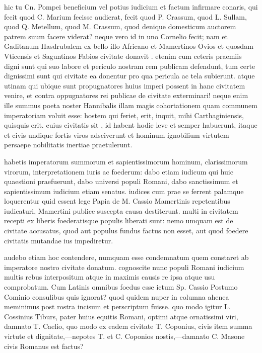  hic tu Cn. Pompei beneficium vel potius iudicium et factum infirmare conaris, qui fecit quod C. Marium fecisse audierat, fecit quod P. Crassum, quod L. Sullam, quod Q. Metellum, quod M. Crassum, quod denique domesticum auctorem patrem suum facere viderat? neque vero id in uno Cornelio fecit; nam et Gaditanum Hasdrubalem ex bello illo Africano et Mamertinos Ovios et quosdam Vticensis et Saguntinos Fabios civitate donavit . etenim cum ceteris praemiis digni sunt qui suo labore et periculo nostram rem publicam defendunt, tum certe dignissimi sunt qui civitate ea donentur pro qua pericula ac tela subierunt. atque utinam qui ubique sunt propugnatores huius imperi possent in hanc civitatem venire, et contra oppugnatores rei publicae de civitate exterminari! neque enim ille summus poeta noster Hannibalis illam magis cohortationem quam communem imperatoriam voluit esse: hostem qui feriet, erit, inquit, mihi Carthaginiensis, quisquis erit. cuius civitatis sit , id habent hodie leve et semper habuerunt, itaque et civis undique fortis viros adsciverunt et hominum ignobilium virtutem persaepe nobilitatis inertiae praetulerunt.

 habetis imperatorum summorum et sapientissimorum hominum, clarissimorum virorum, interpretationem iuris ac foederum: dabo etiam iudicum qui huic quaestioni praefuerunt, dabo universi populi Romani, dabo sanctissimum et sapientissimum iudicium etiam senatus. iudices cum prae se ferrent palamque loquerentur quid essent lege Papia de M. Cassio Mamertinis repetentibus iudicaturi, Mamertini publice suscepta causa destiterunt. multi in civitatem recepti ex liberis foederatisque populis liberati sunt: nemo umquam est de civitate accusatus, quod aut populus fundus factus non esset, aut quod foedere civitatis mutandae ius impediretur.

 audebo etiam hoc contendere, numquam esse condemnatum quem constaret ab imperatore nostro civitate donatum. cognoscite nunc populi Romani iudicium multis rebus interpositum atque in maximis causis re ipsa atque usu comprobatum. Cum Latinis omnibus foedus esse ictum Sp. Cassio Postumo Cominio consulibus quis ignorat? quod quidem nuper in columna ahenea meminimus post rostra incisum et perscriptum fuisse. quo modo igitur L. Cossinius Tiburs, pater huius equitis Romani, optimi atque ornatissimi viri, damnato T. Caelio, quo modo ex eadem civitate T. Coponius, civis item summa virtute et dignitate,—nepotes T. et C. Coponios nostis,—damnato C. Masone civis Romanus est factus?

